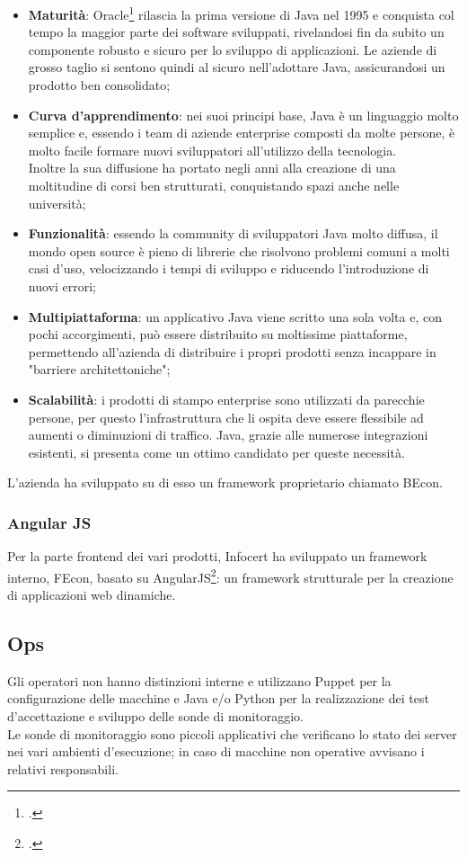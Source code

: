\begin{itemize}
	\item \textbf{Maturità}: Oracle\footcite{site:oracle} rilascia la prima versione di Java nel 1995 e conquista col tempo la maggior parte dei software sviluppati, rivelandosi fin da subito un componente robusto e sicuro per lo sviluppo di applicazioni. Le aziende di grosso taglio si sentono quindi al sicuro nell'adottare Java, assicurandosi un prodotto ben consolidato;
	\item \textbf{Curva d'apprendimento}: nei suoi principi base, Java è un linguaggio molto semplice e, essendo i team di aziende enterprise composti da molte persone, è molto facile formare nuovi sviluppatori all'utilizzo della tecnologia.\\
	Inoltre la sua diffusione ha portato negli anni alla creazione di una moltitudine di corsi ben strutturati, conquistando spazi anche nelle università;
	\item \textbf{Funzionalità}: essendo la community di sviluppatori Java molto diffusa, il mondo open source è pieno di librerie che risolvono problemi comuni a molti casi d'uso, velocizzando i tempi di sviluppo e riducendo l'introduzione di nuovi errori;
	\item \textbf{Multipiattaforma}: un applicativo Java viene scritto una sola volta e, con pochi accorgimenti, può essere distribuito su moltissime piattaforme, permettendo all'azienda di distribuire i propri prodotti senza incappare in "barriere architettoniche";
	\item \textbf{Scalabilità}: i prodotti di stampo enterprise sono utilizzati da parecchie persone, per questo l'infrastruttura che li ospita deve essere flessibile ad aumenti o diminuzioni di traffico. Java, grazie alle numerose integrazioni esistenti, si presenta come un ottimo candidato per queste necessità.
\end{itemize}
L'azienda ha sviluppato su di esso un \gls{framework} proprietario chiamato BEcon.
\subsubsection{Angular JS}
Per la parte frontend dei vari prodotti, Infocert ha sviluppato un \gls{framework} interno, FEcon, basato su AngularJS\footcite{site:angular}: un \gls{framework} strutturale per la creazione di applicazioni web dinamiche.
\subsection{Ops}
Gli operatori non hanno distinzioni interne e utilizzano Puppet per la configurazione delle macchine e Java e/o Python per la realizzazione dei test d'accettazione e sviluppo delle sonde di monitoraggio. \\
Le sonde di monitoraggio sono piccoli applicativi che verificano lo stato dei server nei vari ambienti d'esecuzione; in caso di macchine non operative avvisano i relativi responsabili.
